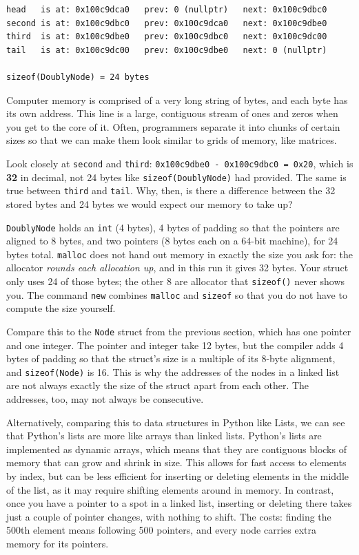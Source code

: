 \begin{verbatim}
head   is at: 0x100c9dca0   prev: 0 (nullptr)   next: 0x100c9dbc0
second is at: 0x100c9dbc0   prev: 0x100c9dca0   next: 0x100c9dbe0
third  is at: 0x100c9dbe0   prev: 0x100c9dbc0   next: 0x100c9dc00
tail   is at: 0x100c9dc00   prev: 0x100c9dbe0   next: 0 (nullptr)

sizeof(DoublyNode) = 24 bytes
\end{verbatim}

Computer memory is comprised of a very long string of bytes, and each byte has its own address. This line is a large, contiguous stream of ones and zeros when you get to the core of it. Often, programmers separate it into chunks of certain sizes so that we can make them look similar to grids of memory, like matrices. 

Look closely at \texttt{second} and \texttt{third}: \texttt{0x100c9dbe0 - 0x100c9dbc0 = 0x20}, which is \textbf{32} in decimal, not 24 bytes like \texttt{sizeof(DoublyNode)} had provided. The same is true between \texttt{third} and \texttt{tail}. Why, then, is there a difference between the 32 stored bytes and 24 bytes we would expect our memory to take up?

\texttt{DoublyNode} holds an \texttt{int} (4 bytes), 4 bytes of padding so that the pointers are aligned to 8 bytes, and two pointers (8 bytes each on a 64-bit machine), for 24 bytes total. \texttt{malloc} does not hand out memory in exactly the size you ask for: the allocator \emph{rounds each allocation up}, and in this run it gives 32 bytes. Your struct only uses 24 of those bytes; the other 8 are allocator  that \texttt{sizeof()} never shows you. The command \texttt{new} combines \texttt{malloc} and \texttt{sizeof} so that you do not have to compute the size yourself. 

Compare this to the \texttt{Node} struct from the previous section, which has one pointer and one integer. The pointer and integer take 12 bytes, but the compiler adds 4 bytes of padding so that the struct's size is a multiple of its 8-byte alignment, and \texttt{sizeof(Node)} is 16. This is why the addresses of the nodes in a linked list are not always exactly the size of the struct apart from each other. The addresses, too, may not always be consecutive.

Alternatively, comparing this to data structures in Python like Lists, we can see that Python's lists are more like arrays than linked lists. Python's lists are implemented as dynamic arrays, which means that they are contiguous blocks of memory that can grow and shrink in size. This allows for fast access to elements by index, but can be less efficient for inserting or deleting elements in the middle of the list, as it may require shifting elements around in memory. In contrast, once you have a pointer to a spot in a linked list, inserting or deleting there takes just a couple of pointer changes, with nothing to shift. The costs: finding the 500th element means following 500 pointers, and every node carries extra memory for its pointers.

